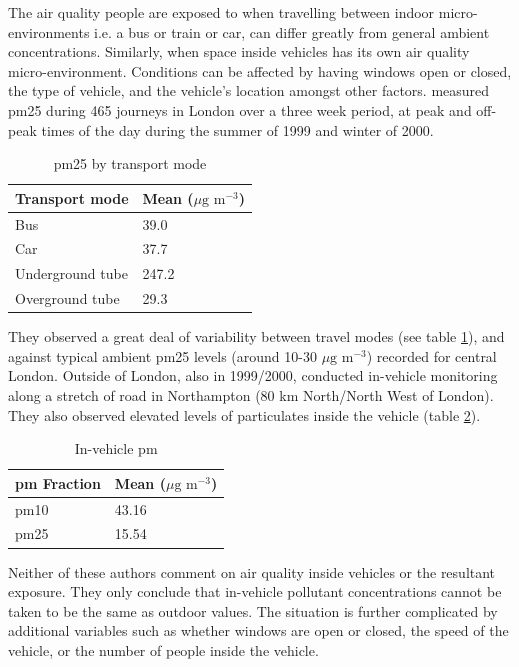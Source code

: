 The air quality people are exposed to when travelling between indoor micro-environments i.e. a bus or train or car, can differ greatly from general ambient concentrations. Similarly, when space inside vehicles has its own air quality micro-environment. Conditions can be affected by having windows open or closed, the type of vehicle, and the vehicle's location amongst other factors. \cite{Adams2001} measured \gls{pm25} during 465 journeys in London over a three week period, at peak and off-peak times of the day during the summer of 1999 and winter of 2000.

\begin{table}[H]
\caption{\gls{pm25} by transport mode}
\centering
    \begin{tabular}{ | l | l |}
    \hline 
     \bfseries{Transport mode} & \bfseries{Mean ($\mu \text{g m}^{-3}$)} \\ \hline
     Bus & 39.0\\ \hline
     Car & 37.7\\ \hline
     Underground tube & 247.2\\ \hline
     Overground tube & 29.3\\ \hline
    \end{tabular}
\label{tab:adams_transport_means}
\end{table}

They observed a great deal of variability between travel modes (see table \ref{tab:adams_transport_means}), and against typical ambient \gls{pm25} levels (around 10-30 $\mu \text{g m}^{-3}$) recorded for central London. Outside of London, also in 1999/2000, \cite{Gulliver2004} conducted in-vehicle monitoring along a stretch of road in Northampton (80 km North/North West of London). They also observed elevated levels of particulates inside the vehicle (table \ref{tab:gulliver_vehicle_means}).

\begin{table}[H]
\caption{In-vehicle \gls{pm}}
\centering
    \begin{tabular}{ | l | l |}
    \hline 
     \bfseries{\gls{pm} Fraction} & \bfseries{Mean ($\mu \text{g m}^{-3}$)} \\ \hline
     \gls{pm10} & 43.16\\ \hline
     \gls{pm25} & 15.54\\ \hline
    \end{tabular}
\label{tab:gulliver_vehicle_means}
\end{table}

Neither of these authors comment on air quality inside vehicles or the resultant exposure. They only conclude that in-vehicle pollutant concentrations cannot be taken to be the same as outdoor values. The situation is further complicated by additional variables such as whether windows are open or closed, the speed of the vehicle, or the number of people inside the vehicle.

